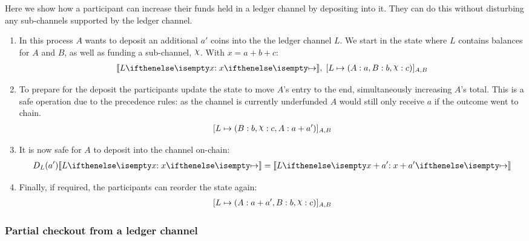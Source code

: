 \documentclass{article}
\begin{document}
Here we show how a participant can increase their funds held in a ledger channel by depositing into it.
They can do this without disturbing any sub-channels supported by the ledger channel.
\begin{enumerate}
  \item In this process $A$ wants to deposit an additional $a'$ coins into the the ledger channel $L$. We start in the state where $L$ contains balances for $A$ and $B$, as well as funding a sub-channel, $\rchi$. With $x = a + b + c$:
  \begin{align}
    \adj{\holds{L}{x}{}}, \; \finalizable{L}{\alloc{A: a, B: b, \rchi: c}}{A, B}
  \end{align}
  \item To prepare for the deposit the participants update the state to move $A$'s entry to the end, simultaneously increasing $A$'s total. This is a safe operation due to the precedence rules: as the channel is currently underfunded $A$ would still only receive $a$ if the outcome went to chain.
  \begin{align}
    \finalizable{L}{\alloc{B:b, \rchi: c, A: a + a'}}{A,B}
  \end{align}
  \item It is now safe for $A$ to deposit into the channel on-chain:
  \begin{align}
    D_L(a')\adj{\holds{L}{x}{}} = \adj{\holds{L}{x + a'}{}}
  \end{align}
  \item Finally, if required, the participants can reorder the state again:
  \begin{align}
    \finalizable{L}{\alloc{ A: a + a', B: b, \rchi: c}}{A,B}
  \end{align}
\end{enumerate}


\subsubsection{Partial checkout from a ledger channel}
\end{document}
